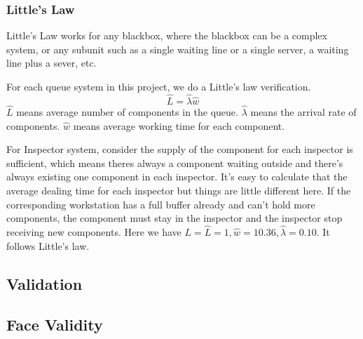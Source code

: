 \documentclass{article}
\begin{document}
\subsubsection{Little's Law}

Little's Law works for any blackbox, where the blackbox can be a complex system, or  any subunit such as a single waiting line or a single server, a waiting line plus a sever, etc. 

For each queue system in this project, we do a Little's law verification.
\begin{equation}
\hat L = \hat \lambda \hat w
\end{equation}
$\hat L$ means average number of components in the queue. $\hat \lambda$ means the arrival rate of components. $\hat w$ means average working time for each component.

For Inspector system, consider the supply of the component for each inspector is sufficient, which means theres always a component waiting outside and there's always existing one component in each inspector. It's easy to calculate that the average dealing time for each inspector but things are little different here. If the corresponding workstation has a full buffer already and can't hold more components, the component must stay in the inspector and the inspector stop receiving new components. Here we have $L=\hat L =1, \hat w = 10.36, \hat \lambda = 0.10$. It follows Little's law.




\subsection{Validation}
\subsection{Face Validity}
\end{document}
